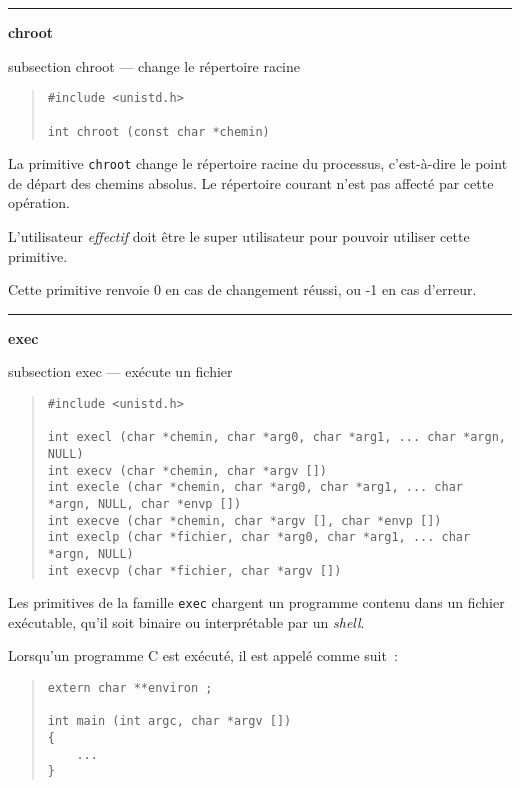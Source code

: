 \documentclass [twoside] {report}
\newcommand {\primitive} [1]
    {
	\phantomsection
	{\large \textbf {#1}}
	\addcontentsline {toc} {subsection} {#1}
    }
\newcommand {\separation}
    {
	\vspace {5mm}
	\nopagebreak
	\hrule
    }
\begin{document}
\separation
\primitive {chroot} --- change le répertoire racine

\begin {quote}
\begin {verbatim}
#include <unistd.h>

int chroot (const char *chemin)
\end{verbatim}
\end {quote}

La primitive \texttt {chroot} change le répertoire
racine du processus, c'est-à-dire le point de
départ des chemins absolus. Le répertoire courant
n'est pas affecté par cette opération.

L'utilisateur \emph {effectif} doit être le super
utilisateur pour pouvoir utiliser cette primitive.

Cette primitive renvoie 0 en cas de changement
réussi, ou -1 en cas d'erreur.




\separation
\primitive {exec} --- exécute un fichier

\begin {quote}
\begin {verbatim}
#include <unistd.h>

int execl (char *chemin, char *arg0, char *arg1, ... char *argn, NULL)
int execv (char *chemin, char *argv [])
int execle (char *chemin, char *arg0, char *arg1, ... char *argn, NULL, char *envp [])
int execve (char *chemin, char *argv [], char *envp [])
int execlp (char *fichier, char *arg0, char *arg1, ... char *argn, NULL)
int execvp (char *fichier, char *argv [])
\end{verbatim}
\end {quote}

Les primitives de la famille \texttt {exec} chargent un
programme contenu dans un fichier exécutable,
qu'il soit binaire ou interprétable par un
\emph {shell}.

Lorsqu'un programme C est exécuté, il est appelé
comme suit~:

\begin {quote}
\begin {verbatim}
extern char **environ ;

int main (int argc, char *argv [])
{
    ...
}
\end{verbatim}
\end {quote}
\end{document}
